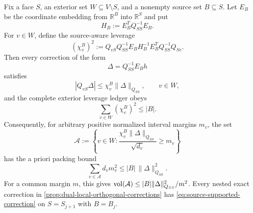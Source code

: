 \begin{lemma}
\label{lem:source-aware-leverage-packing}
Fix a face $S$, an exterior set $W\subseteq V\setminus S$, and a nonempty
source set $B\subseteq S$.  Let $E_B$ be the coordinate embedding from
$\mathbb R^B$ into $\mathbb R^S$ and put
\begin{equation}
 H_B:=E_B^TQ_{SS}^{-1}E_B.
 \label{eq:source-green-block}
\end{equation}
For $v\in W$, define the source-aware leverage
\begin{equation}
 (\chi_v^{B})^2
 :=Q_{vS}Q_{SS}^{-1}E_BH_B^{-1}
       E_B^TQ_{SS}^{-1}Q_{Sv}.
 \label{eq:source-aware-leverage}
\end{equation}
Then every correction of the form
\begin{equation}
 \Delta=Q_{SS}^{-1}E_Bh
 \label{eq:source-supported-correction}
\end{equation}
satisfies
\begin{equation}
 |Q_{vS}\Delta|
 \leq\chi_v^B\|\Delta\|_{Q_{SS}},
 \qquad v\in W,
 \label{eq:source-aware-interval}
\end{equation}
and the complete exterior leverage ledger obeys
\begin{equation}
 \sum_{v\in W}(\chi_v^B)^2\leq |B|.
 \label{eq:source-aware-leverage-sum}
\end{equation}
Consequently, for arbitrary positive normalized interval margins $m_v$, the
set
\begin{equation*}
 \mathcal A
 :=\left\{v\in W:
   \frac{\chi_v^B\|\Delta\|_{Q_{SS}}}{\sqrt{d_v}}
   \geq m_v
 \right\}
\end{equation*}
has the a priori packing bound
\begin{equation}
 \sum_{v\in\mathcal A}d_vm_v^2
 \leq |B|\,\|\Delta\|_{Q_{SS}}^2.
 \label{eq:source-aware-ambiguous-packing}
\end{equation}
For a common margin $m$, this gives
$\operatorname{vol}(\mathcal A)\leq |B|\|\Delta\|_{Q_{SS}}^2/m^2$.
Every nested exact correction in
\cref{prop:dual-local-orthogonal-corrections} has
\cref{eq:source-supported-correction} on $S=S_{j+1}$ with $B=B_j$.
\end{lemma}

